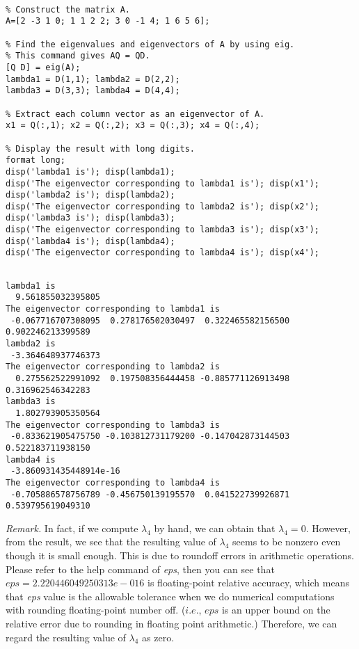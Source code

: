 \begin{sol}

\begin{verbatim}

% Construct the matrix A.
A=[2 -3 1 0; 1 1 2 2; 3 0 -1 4; 1 6 5 6];

% Find the eigenvalues and eigenvectors of A by using eig.
% This command gives AQ = QD.
[Q D] = eig(A); 
lambda1 = D(1,1); lambda2 = D(2,2); 
lambda3 = D(3,3); lambda4 = D(4,4); 

% Extract each column vector as an eigenvector of A.
x1 = Q(:,1); x2 = Q(:,2); x3 = Q(:,3); x4 = Q(:,4);

% Display the result with long digits.
format long; 
disp('lambda1 is'); disp(lambda1);
disp('The eigenvector corresponding to lambda1 is'); disp(x1');
disp('lambda2 is'); disp(lambda2);
disp('The eigenvector corresponding to lambda2 is'); disp(x2');
disp('lambda3 is'); disp(lambda3);
disp('The eigenvector corresponding to lambda3 is'); disp(x3');
disp('lambda4 is'); disp(lambda4);
disp('The eigenvector corresponding to lambda4 is'); disp(x4');
\end{verbatim}

\begin{outputs}
\begin{verbatim}

lambda1 is
  9.561855032395805
The eigenvector corresponding to lambda1 is
 -0.067716707308095  0.278176502030497  0.322465582156500  0.902246213399589
lambda2 is
 -3.364648937746373
The eigenvector corresponding to lambda2 is
  0.275562522991092  0.197508356444458 -0.885771126913498  0.316962546342283
lambda3 is
  1.802793905350564
The eigenvector corresponding to lambda3 is
 -0.833621905475750 -0.103812731179200 -0.147042873144503  0.522183711938150
lambda4 is
 -3.860931435448914e-16
The eigenvector corresponding to lambda4 is
 -0.705886578756789 -0.456750139195570  0.041522739926871  0.539795619049310
\end{verbatim}

\end{outputs}


\noindent\textit{Remark.} In fact, if we compute $\lambda_{4}$ by hand, we can obtain that $\lambda_{4}=0$. However, from the result, we see that the resulting value of $\lambda_{4}$ seems to be nonzero even though it is small enough. This is due to roundoff errors in arithmetic operations. Please refer to the help command of \textit{eps}, then you can see that $eps = 2.220446049250313e-016$ is floating-point relative accuracy, which means that \textit{eps} value is the allowable tolerance when we do numerical computations with rounding floating-point number off. ($i.e.$, $eps$ is an upper bound on the relative error due to rounding in floating point arithmetic.)
Therefore, we can regard the resulting value of $\lambda_{4}$ as zero.
\end{sol}

